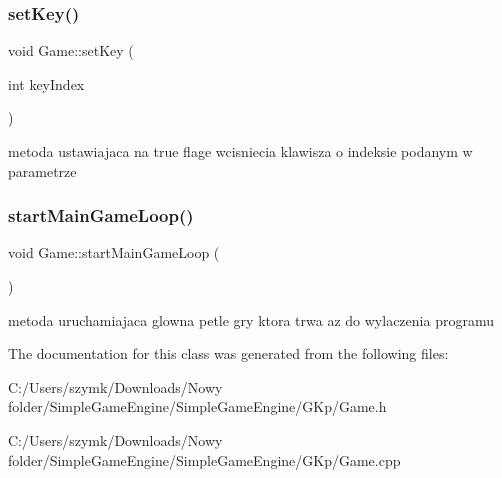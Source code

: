 \mbox{\label{class_game_a403da81cad9f17da729f7362768ba118}} 
\subsubsection{\texorpdfstring{set\+Key()}{setKey()}}
{\footnotesize\ttfamily void Game\+::set\+Key (\begin{DoxyParamCaption}\item[{int}]{key\+Index }\end{DoxyParamCaption})}



metoda ustawiajaca na true flage wcisniecia klawisza o indeksie podanym w parametrze 

\mbox{\label{class_game_abf74d863d666bc8e1c5aa8942ba0ac18}} 
\subsubsection{\texorpdfstring{start\+Main\+Game\+Loop()}{startMainGameLoop()}}
{\footnotesize\ttfamily void Game\+::start\+Main\+Game\+Loop (\begin{DoxyParamCaption}{ }\end{DoxyParamCaption})\hspace{0.3cm}{\ttfamily [virtual]}}



metoda uruchamiajaca glowna petle gry ktora trwa az do wylaczenia programu 



The documentation for this class was generated from the following files\+:\begin{DoxyCompactItemize}
\item 
C\+:/\+Users/szymk/\+Downloads/\+Nowy folder/\+Simple\+Game\+Engine/\+Simple\+Game\+Engine/\+G\+Kp/Game.\+h\item 
C\+:/\+Users/szymk/\+Downloads/\+Nowy folder/\+Simple\+Game\+Engine/\+Simple\+Game\+Engine/\+G\+Kp/Game.\+cpp\end{DoxyCompactItemize}

